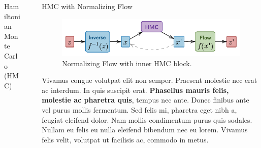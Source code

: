 \documentclass[final]{beamer}
\newlength{\sepwidth}
\newlength{\colwidth}
\newcommand{\separatorcolumn}{\begin{column}{\sepwidth}\end{column}}
\begin{document}
\begin{frame}[t]
\begin{columns}[t]
\begin{column}{\colwidth}
\begin{alertblock}{Hamiltonian Monte Carlo (HMC)}

  \end{alertblock}

\end{column}

\separatorcolumn

\begin{column}{\colwidth}

  \begin{block}{HMC with Normalizing Flow}

    \begin{figure}
      \centering
      \includegraphics[width=\columnwidth]{assets/ftHMC}
      \caption{Normalizing Flow with inner HMC block.}
    \end{figure}

    Vivamus congue volutpat elit non semper. Praesent molestie nec erat ac
    interdum. In quis suscipit erat. \textbf{Phasellus mauris felis, molestie
    ac pharetra quis}, tempus nec ante. Donec finibus ante vel purus mollis
    fermentum. Sed felis mi, pharetra eget nibh a, feugiat eleifend dolor. Nam
    mollis condimentum purus quis sodales. Nullam eu felis eu nulla eleifend
    bibendum nec eu lorem. Vivamus felis velit, volutpat ut facilisis ac,
    commodo in metus.


\end{block}
\end{column}
\end{columns}
\end{frame}
\end{document}
